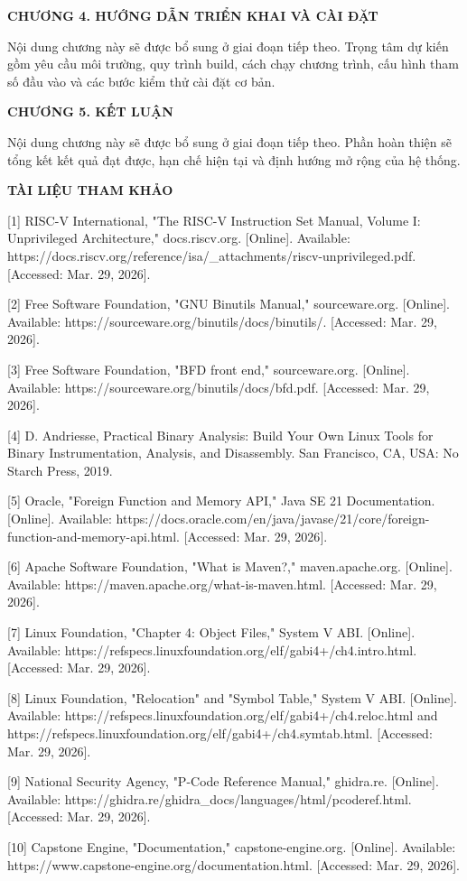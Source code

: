 \documentclass[
]{article}
\begin{document}
\textbf{CHƯƠNG 4. HƯỚNG DẪN TRIỂN KHAI VÀ CÀI ĐẶT}

Nội dung chương này sẽ được bổ sung ở giai đoạn tiếp theo. Trọng tâm dự
kiến gồm yêu cầu môi trường, quy trình build, cách chạy chương trình,
cấu hình tham số đầu vào và các bước kiểm thử cài đặt cơ bản.

\textbf{CHƯƠNG 5. KẾT LUẬN}

Nội dung chương này sẽ được bổ sung ở giai đoạn tiếp theo. Phần hoàn
thiện sẽ tổng kết kết quả đạt được, hạn chế hiện tại và định hướng mở
rộng của hệ thống.

\textbf{TÀI LIỆU THAM KHẢO}

{[}1{]} RISC-V International, "The RISC-V Instruction Set Manual, Volume
I: Unprivileged Architecture," docs.riscv.org. {[}Online{]}. Available:
https://docs.riscv.org/reference/isa/\_attachments/riscv-unprivileged.pdf.
{[}Accessed: Mar. 29, 2026{]}.

{[}2{]} Free Software Foundation, "GNU Binutils Manual," sourceware.org.
{[}Online{]}. Available: https://sourceware.org/binutils/docs/binutils/.
{[}Accessed: Mar. 29, 2026{]}.

{[}3{]} Free Software Foundation, "BFD front end," sourceware.org.
{[}Online{]}. Available: https://sourceware.org/binutils/docs/bfd.pdf.
{[}Accessed: Mar. 29, 2026{]}.

{[}4{]} D. Andriesse, Practical Binary Analysis: Build Your Own Linux
Tools for Binary Instrumentation, Analysis, and Disassembly. San
Francisco, CA, USA: No Starch Press, 2019.

{[}5{]} Oracle, "Foreign Function and Memory API," Java SE 21
Documentation. {[}Online{]}. Available:
https://docs.oracle.com/en/java/javase/21/core/foreign-function-and-memory-api.html.
{[}Accessed: Mar. 29, 2026{]}.

{[}6{]} Apache Software Foundation, "What is Maven?," maven.apache.org.
{[}Online{]}. Available: https://maven.apache.org/what-is-maven.html.
{[}Accessed: Mar. 29, 2026{]}.

{[}7{]} Linux Foundation, "Chapter 4: Object Files," System V ABI.
{[}Online{]}. Available:
https://refspecs.linuxfoundation.org/elf/gabi4+/ch4.intro.html.
{[}Accessed: Mar. 29, 2026{]}.

{[}8{]} Linux Foundation, "Relocation" and "Symbol Table," System V ABI.
{[}Online{]}. Available:
https://refspecs.linuxfoundation.org/elf/gabi4+/ch4.reloc.html and
https://refspecs.linuxfoundation.org/elf/gabi4+/ch4.symtab.html.
{[}Accessed: Mar. 29, 2026{]}.

{[}9{]} National Security Agency, "P-Code Reference Manual," ghidra.re.
{[}Online{]}. Available:
https://ghidra.re/ghidra\_docs/languages/html/pcoderef.html.
{[}Accessed: Mar. 29, 2026{]}.

{[}10{]} Capstone Engine, "Documentation," capstone-engine.org.
{[}Online{]}. Available:
https://www.capstone-engine.org/documentation.html. {[}Accessed: Mar.
29, 2026{]}.
\end{document}
